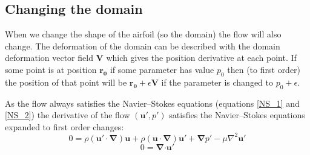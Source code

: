 \documentclass[12pt, a4paper]{article}
\begin{document}
    \subsection{Changing the domain}
    When we change the shape of the airfoil (so the domain) the flow will also change. The deformation of the domain can be described with the domain deformation vector field $\mathbf{V}$ which gives the position derivative at each point. If some point is at position $\mathbf{r_0}$ if some parameter has value $p_0$ then (to first order) the position of that point will be $\mathbf{r_0} + \epsilon \mathbf{V}$ if the parameter is changed to $p_0 + \epsilon$.
    
    As the flow always satisfies the Navier--Stokes equations (equations \ref{NS_1} and \ref{NS_2}) the derivative of the flow $(\mathbf{u'}, p')$ satisfies the Navier--Stokes equations expanded to first order changes:
    \begin{equation} \label{NS_der_1}
    0 = \rho (\mathbf{u' \cdot} \boldsymbol{\nabla}) \mathbf{u} + 
    \rho (\mathbf{u \cdot} \boldsymbol{\nabla}) \mathbf{u'} + 
    \boldsymbol{\nabla} p' - 
    \mu \nabla^2 \mathbf{u'}
    \end{equation}
    \begin{equation} \label{NS_der_2}
    0 = \boldsymbol{\nabla} \mathbf{\cdot u'}
    \end{equation}
    
\end{document}
